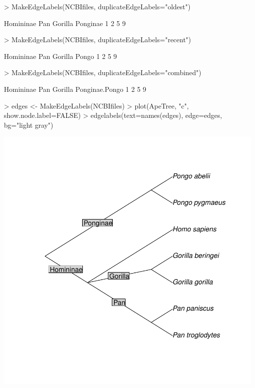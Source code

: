 \documentclass[12pt]{article}
\begin{document}
\begin {center}
\begin{Schunk}
\begin{Sinput}
> MakeEdgeLabels(NCBIfiles, duplicateEdgeLabels="oldest")
\end{Sinput}
\begin{Soutput}
Homininae       Pan   Gorilla  Ponginae 
        1         2         5         9 
\end{Soutput}
\begin{Sinput}
> MakeEdgeLabels(NCBIfiles, duplicateEdgeLabels="recent")
\end{Sinput}
\begin{Soutput}
Homininae       Pan   Gorilla     Pongo 
        1         2         5         9 
\end{Soutput}
\begin{Sinput}
> MakeEdgeLabels(NCBIfiles, duplicateEdgeLabels="combined")
\end{Sinput}
\begin{Soutput}
     Homininae            Pan        Gorilla Ponginae.Pongo 
             1              2              5              9 
\end{Soutput}
\begin{Sinput}
> edges <- MakeEdgeLabels(NCBIfiles)
> plot(ApeTree, "c", show.node.label=FALSE)
> edgelabels(text=names(edges), edge=edges, bg="light gray")
\end{Sinput}
\end{Schunk}
\includegraphics{ReolUserManual-015}
\end{center}
\end{document}
